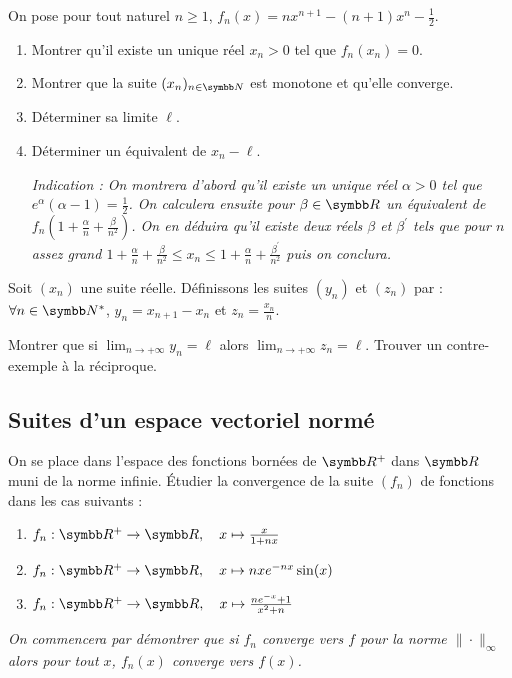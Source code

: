 \begin{exercice}
On pose pour tout naturel $n\geqslant1$, $f_{n}(x)=nx^{n+1}-(n+1)x^{n}-\frac{1}{2}$.
\begin{enumerate}
    \item Montrer qu'il existe un unique réel $x_{n}>0$ tel que $f_{n}(x_{n})=0$.
    \item Montrer que la suite $(x_{n})_{n\in\N}$ est monotone et qu'elle converge.
    \item Déterminer sa limite $\ell$.
    \item Déterminer un équivalent de $x_{n}-\ell$.

    \textit{Indication : On montrera d'abord qu'il existe un unique réel $\alpha>0$ tel que $e^{\alpha}(\alpha-1)=\frac{1}{2}$. 
    On calculera ensuite pour $\beta\in\R$ un équivalent de $f_{n}\left(1+\frac{\alpha}{n}+\frac{\beta}{n^{2}}\right)$. 
    On en déduira qu'il existe deux réels $\beta$ et $\beta^{\prime}$ tels que pour $n$ assez grand 
    $1+\frac{\alpha}{n}+\frac{\beta}{n^{2}}\leqslant x_{n}\leqslant 1+\frac{\alpha}{n}+\frac{\beta^{\prime}}{n^{2}}$ puis on conclura.}
\end{enumerate}
\end{exercice}

\begin{exercice}
    Soit $(x_{n})$ une suite réelle. Définissons les suites $(y_{n})$ et $(z_{n})$ par :
    $\forall n\in\N^{*}$, $y_{n}=x_{n+1}-x_{n}$ et $z_{n}=\frac{x_{n}}{n}$.

    Montrer que si $\lim_{n \to + \infty} y_{n} = \ell$ alors $\lim_{n \to + \infty} z_{n} = \ell$.
    Trouver un contre-exemple à la réciproque.
\end{exercice}

\subsection{Suites d'un espace vectoriel normé}
\begin{exercice}
    On se place dans l'espace des fonctions bornées de $\R^{+}$ dans $\R$ muni de la norme infinie.
    Étudier la convergence de la suite $(f_{n})$ de fonctions dans les cas suivants :
    \begin{enumerate}
        \item $f_{n}:\R^{+}\rightarrow\R, \quad x\mapsto\frac{x}{1+nx}$
        \item $f_{n}:\R^{+}\rightarrow\R, \quad x\mapsto nxe^{-nx}\sin(x)$
        \item $f_{n}:\R^{+}\rightarrow\R, \quad x\mapsto\frac{ne^{-x}+1}{x^{2}+n}$
    \end{enumerate}
    \textit{On commencera par démontrer que si $f_{n}$ converge vers $f$ pour la norme $\|\cdot\|_{\infty}$ alors pour tout $x$, $f_{n}(x)$ converge vers $f(x)$.}
\end{exercice}

